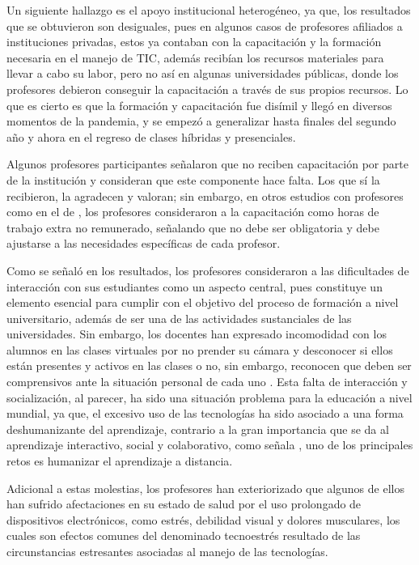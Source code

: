 \documentclass[spanish]{textolivre}
\begin{document}
Un siguiente hallazgo es el apoyo institucional heterogéneo, ya que, los resultados que se obtuvieron son desiguales, pues en algunos casos de profesores afiliados a instituciones privadas, estos ya contaban con la capacitación y la formación necesaria en el manejo de TIC, además recibían los recursos materiales para llevar a cabo su labor, pero no así en algunas universidades públicas, donde los profesores debieron conseguir la capacitación a través de sus propios recursos. Lo que es cierto es que la formación y capacitación fue disímil y llegó en diversos momentos de la pandemia, y se empezó a generalizar hasta finales del segundo año y ahora en el regreso de clases híbridas y presenciales.

Algunos profesores participantes señalaron que no reciben capacitación por parte de la institución y consideran que este componente hace falta. Los que sí la recibieron, la agradecen y valoran; sin embargo, en otros estudios con profesores como en el de \textcite{rocha_estrada_docentes_2022}, los profesores consideraron a la capacitación como horas de trabajo extra no remunerado, señalando que no debe ser obligatoria y debe ajustarse a las necesidades específicas de cada profesor.

Como se señaló en los resultados, los profesores consideraron a las dificultades de interacción con sus estudiantes como un aspecto central, pues constituye un elemento esencial para cumplir con el objetivo del proceso de formación a nivel universitario, además de ser una de las actividades sustanciales de las universidades. Sin embargo, los docentes han expresado incomodidad con los alumnos en las clases virtuales por no prender su cámara y desconocer si ellos están presentes y activos en las clases o no, sin embargo, reconocen que deben ser comprensivos ante la situación personal de cada uno \cite{monetti_ensenar_2021}. Esta falta de interacción y socialización, al parecer, ha sido una situación problema para la educación a nivel mundial, ya que, el excesivo uso de las tecnologías ha sido asociado a una forma deshumanizante del aprendizaje, contrario a la gran importancia que se da al aprendizaje interactivo, social y colaborativo, como señala \textcite{covarrubias_hernandez_educacion_2021}, uno de los principales retos es humanizar el aprendizaje a distancia. 

Adicional a estas molestias, los profesores han exteriorizado que algunos de ellos han sufrido afectaciones en su estado de salud por el uso prolongado de dispositivos electrónicos, como estrés, debilidad visual y dolores musculares, los cuales son efectos comunes del denominado tecnoestrés \cite{tarafdar_impact_2007, ragu-nathan_consequences_2008} resultado de las circunstancias estresantes asociadas al manejo de las tecnologías.
\end{document}
